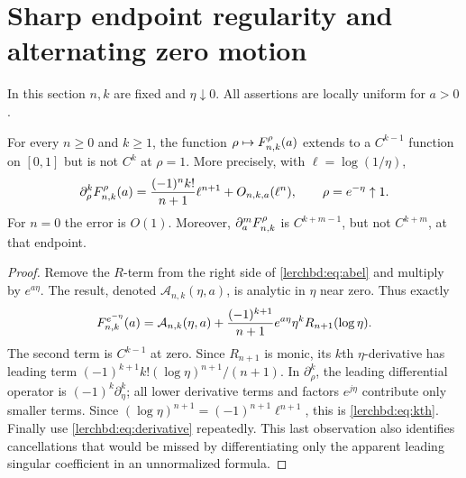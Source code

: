 \section{Sharp endpoint regularity and alternating zero motion}\label{lerchbd:sec:endpoint}
In this section $n,k$ are fixed and $\eta\downarrow0$. All assertions are locally uniform for $a>0$.

\begin{theorem}\label{lerchbd:thm:regularity}
For every $n\ge0$ and $k\ge1$, the function $\rho\mapsto F_{n,k}^{\rho}(a)$ extends to a $C^{k-1}$ function on $[0,1]$ but is not $C^k$ at $\rho=1$. More precisely, with $\ell=\log(1/\eta)$,
\begin{equation}\label{lerchbd:eq:kth}
 \partial_\rho^kF_{n,k}^{\rho}(a)
 =\frac{(-1)^n k!}{n+1}\ell^{n+1}+O_{n,k,a}(\ell^n),
 \qquad \rho=e^{-\eta}\uparrow1.
\end{equation}
For $n=0$ the error is $O(1)$. Moreover, $\partial_a^mF_{n,k}^{\rho}$ is $C^{k+m-1}$, but not $C^{k+m}$, at that endpoint.
\end{theorem}
\begin{proof}
Remove the $R$-term from the right side of \eqref{lerchbd:eq:abel} and multiply by $e^{a\eta}$. The result, denoted $\mathcal A_{n,k}(\eta,a)$, is analytic in $\eta$ near zero. Thus exactly
\begin{equation}\label{lerchbd:eq:analytic-split}
 F_{n,k}^{e^{-\eta}}(a)=\mathcal A_{n,k}(\eta,a)
 +\frac{(-1)^{k+1}}{n+1}e^{a\eta}\eta^k R_{n+1}(\log\eta).
\end{equation}
The second term is $C^{k-1}$ at zero. Since $R_{n+1}$ is monic, its $k$th $\eta$-derivative has leading term
$(-1)^{k+1}k!(\log\eta)^{n+1}/(n+1)$. In $\partial_\rho^k$, the leading differential operator is $(-1)^k\partial_\eta^k$; all lower derivative terms and factors $e^{j\eta}$ contribute only smaller terms. Since $(\log\eta)^{n+1}=(-1)^{n+1}\ell^{n+1}$, this is \eqref{lerchbd:eq:kth}. Finally use \eqref{lerchbd:eq:derivative} repeatedly. This last observation also identifies cancellations that would be missed by differentiating only the apparent leading singular coefficient in an unnormalized formula.
\end{proof}

